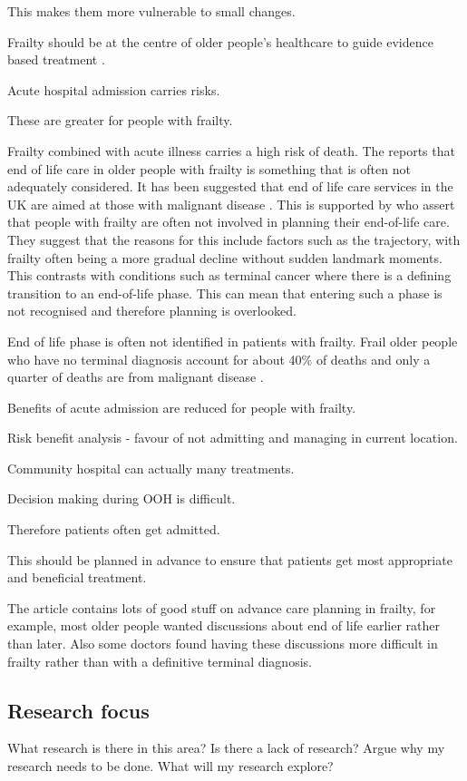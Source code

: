 \documentclass
[
	12pt,
	a4paper,
	oneside,
]{article}
\begin{document}
This makes them more vulnerable to small changes.

Frailty should be at the centre of older people's healthcare to guide evidence
based treatment \parencite{woo:14}.

Acute hospital admission carries risks.

These are greater for people with frailty.

Frailty combined with acute illness carries a high risk of death. 
The \textcite{silver:12} reports that end of life care in older people with frailty
is something that is often not adequately considered. It has been suggested that 
end of life care services in the UK are aimed at those with malignant 
disease \parencite{sharp:13}.
This is supported by \textcite{oliver:14} who assert that people with frailty 
are often not involved in planning their 
end-of-life care. They suggest that the reasons for this include factors such as
the trajectory, with frailty often being a more gradual decline without sudden 
landmark moments. This contrasts with conditions such as terminal cancer where there 
is a defining transition to an end-of-life phase. This can mean that entering such a
phase is not recognised and therefore planning is overlooked. 


End of life phase is often not identified in patients with frailty. 
Frail older people who have no terminal diagnosis account for about 40\% of 
deaths and only a quarter of deaths are from malignant disease \parencite{sharp:13}.

Benefits of acute admission are reduced for people with frailty.

Risk benefit analysis - favour of not admitting and managing in current location.

Community hospital can actually many treatments.

Decision making during OOH is difficult.

Therefore patients often get admitted.

This should be planned in advance to ensure that patients get most appropriate 
and beneficial treatment. 

The article \textcite{sharp:13} contains lots of good
stuff on advance care planning in frailty, for example, most older people wanted
discussions about end of life earlier rather than later. Also some doctors found
having these discussions  more difficult in frailty rather than with a 
definitive terminal diagnosis.

\subsection{Research focus}
What research is there in this area? 
Is there a lack of research? 
Argue why my research needs to be done.
What will my research explore? 
\end{document}
